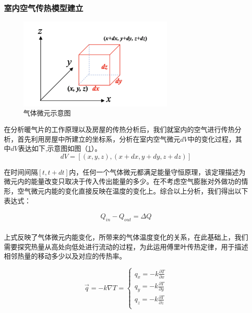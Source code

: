 \documentclass{my_paper}
\begin{document}
\subsubsection{室内空气传热模型建立}
\begin {figure}[h]
\centering %
\includegraphics[width=0.7\textwidth]{sd.png}
\caption{气体微元示意图} %
\label{weiyuan}
\end {figure}
在分析暖气片的工作原理以及房屋的传热分析后，我们就室内的空气进行传热分析，首先利用房屋中所建立的坐标系，分析在室内空气微元$dV$中的变化过程，其中$dV$表达如下,示意图如图（\ref{weiyuan}）。
\begin{equation}
dV = [(x,y,z),(x+dx,y+dy,z+dz)]
\label{}
\end{equation}

在时间间隔$[t,t+dt]$内，任何一个气体微元都满足能量守恒原理，该定理描述为微元内的能量改变只取决于传入传出能量的多少。在不考虑空气膨胀对外做功的情形，空气微元内能的变化直接反映在温度的变化上。综合以上分析，我们得出以下表达式：

\begin{equation}
    \begin{aligned}
        Q_{in} - Q_{out} = \Delta Q\\
\end{aligned}
\label{mianq}
\end{equation}

上式反映了气体微元内能变化，所带来的气体温度变化的关系，在此基础上，我们需要探究热量从高处向低处进行流动的过程，为此运用傅里叶传热定律\cite{2}，用于描述相邻热量的移动多少以及对应的传热率。

\begin{equation}
    \vec{q} = -k\nabla T =\begin{cases}
        q_x = -k \frac{\partial T}{\partial  x}\\
        q_y = -k \frac{\partial T}{\partial  y}\\
        q_z = -k \frac{\partial T}{\partial  z}\\
    \end{cases} 
\end{equation}
\end{document}
